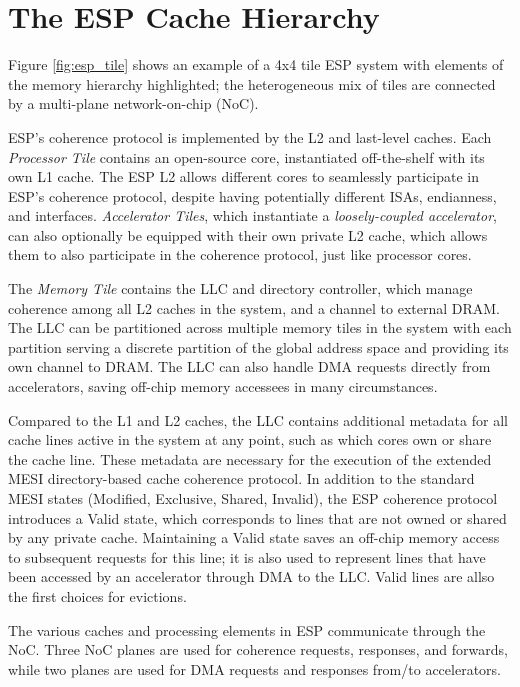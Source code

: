 \section{The ESP Cache Hierarchy}
\label{sec:cache}

Figure \ref{fig:esp_tile} shows an example of a 4x4 tile ESP system with
elements of the memory hierarchy highlighted; the heterogeneous mix of tiles are
connected by a multi-plane network-on-chip (NoC).

ESP's coherence protocol is implemented by the L2 and last-level caches.  Each
\emph{Processor Tile} contains an open-source core, instantiated off-the-shelf
with its own L1 cache. The ESP L2 allows different cores to seamlessly
participate in ESP's coherence protocol, despite having potentially different
ISAs, endianness, and interfaces.  \emph{Accelerator Tiles}, which instantiate
a \emph{loosely-coupled accelerator}, can also optionally be equipped with
their own private L2 cache, which allows them to also participate in the
coherence protocol, just like processor cores.

The \emph{Memory Tile} contains the LLC and directory controller, which manage
coherence among all L2 caches in the system, and a channel to external DRAM.
The LLC can be partitioned across multiple memory tiles in the system with each
partition serving a discrete partition of the global address space and
providing its own channel to DRAM. The LLC can also handle DMA requests
directly from accelerators, saving off-chip memory accessees in many
circumstances.

\par Compared to the L1 and L2 caches, the LLC contains additional metadata for
all cache lines active in the system at any point, such as which cores own or
share the cache line. These metadata are necessary for the execution of the
extended MESI directory-based cache coherence protocol.  In addition to the
standard MESI states (Modified, Exclusive, Shared, Invalid), the ESP coherence
protocol introduces a Valid state, which corresponds to lines that are not
owned or shared by any private cache. Maintaining a Valid state saves an off-chip memory access to subsequent requests for this line; it is also used to represent
lines that have been accessed by an accelerator through DMA to the LLC. Valid lines are allso the first choices for evictions.

The various caches and processing elements in ESP communicate through the NoC.
Three NoC planes are used for coherence requests, responses, and forwards,
while two planes are used for DMA requests and responses from/to accelerators.

